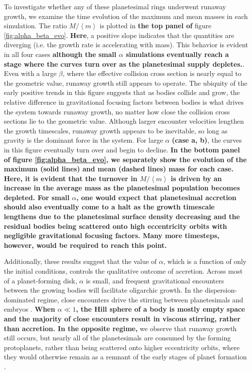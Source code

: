 \documentclass[twocolumn,linenumbers]{aastex63}
\begin{document}
To investigate whether any of these planetesimal rings underwent
runaway growth, we examine the time evolution of the maximum and mean
masses in each simulation. The ratio $M/\left< m \right>$ is plotted
in \textbf{the top panel of} figure \ref{fig:alpha_beta_evo}. \textbf{Here}, a positive slope
indicates that the quantities are diverging (i.e.
the growth rate is accelerating with mass). This behavior is
evident in all four cases \textbf{although the small $\alpha$ simulations eventually reach a stage where the curves
 turn over as the planetesimal supply depletes.}. Even with a large
$\beta$, where the effective collision cross section is
 nearly equal to the geometric value, runaway growth still appears to
operate. The ubiquity of the early positive trends in this figure suggests
that as bodies collide and grow, the
relative difference in gravitational focusing factors between bodies
is what drives the system towards runaway
growth, no matter how close the collision cross sections lie to the geometric value.
Although larger encounter velocities lengthen the growth
timescales, runaway growth appears to be inevitable, so long as
gravity is the dominant force in the system. For large $\alpha$
\textbf{(case a, b)}, the curves in this figure eventually turn over and begin to decline.
\textbf{In the bottom panel of figure \ref{fig:alpha_beta_evo}, we separately show the evolution of
the maximum (solid lines) and mean (dashed lines) mass for each case. Here, it is evident
that the turnover in $M/\left< m \right>$ is
driven by an increase in the average mass as the planetesimal population
becomes depleted. For small $\alpha$, one would expect that planetesimal accretion should also eventually come to a halt as
the growth timescale lengthens due to the planetesimal surface density decreasing and the residual bodies being scattered onto high
eccentricity orbits with negligible gravitational focusing factors. Many more timesteps, however, would be required to reach this point.}

Additionally, these results suggest that the value of $\alpha$, which is a function of only the initial conditions, controls the qualitative outcome of accretion. 
Across most of a planet-forming disk, $\alpha$ is small, and frequent gravitational encounters between the growing bodies will 
facilitate oligarchic growth. In the dispersion-dominated regime, close encounters drive the stirring between planetesimals and 
embryos \citep{weidenschilling89, ida90}. \textbf{When $\alpha \ll 1$, the Hill sphere of a body is mostly empty space and the majority of close encounters result in viscous stirring, rather than accretion. In the opposite regime,} we 
observe that runaway growth still occurs, but nearly all of the planetesimals are consumed by the forming protoplanets, rather 
than being scattered onto higher eccentricity orbits, where they would otherwise remain as a remnant of the early stages of 
planet formation \citep{kokubo98, kokubo00}.
\end{document}
